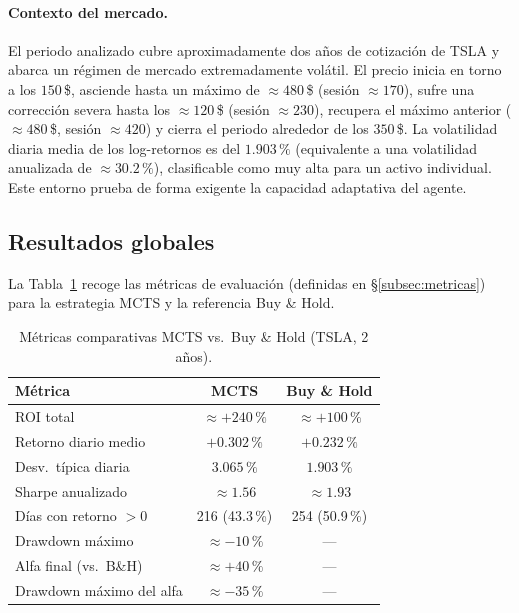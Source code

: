 \paragraph{Contexto del mercado.} El periodo analizado cubre aproximadamente dos años de cotización de TSLA y abarca un régimen de mercado extremadamente volátil. El precio inicia en torno a los $150$\,\$, asciende hasta un máximo de $\approx 480$\,\$ (sesión $\approx 170$), sufre una corrección severa hasta los $\approx 120$\,\$ (sesión $\approx 230$), recupera el máximo anterior ($\approx 480$\,\$, sesión $\approx 420$) y cierra el periodo alrededor de los $350$\,\$. La volatilidad diaria media de los log-retornos es del $1{.}903\,\%$ (equivalente a una volatilidad anualizada de $\approx 30{.}2\,\%$), clasificable como muy alta para un activo individual. Este entorno prueba de forma exigente la capacidad adaptativa del agente.

\subsection{Resultados globales}
\label{subsec:resultados-globales}

La Tabla~\ref{tab:resultados-globales} recoge las métricas de evaluación (definidas en §\ref{subsec:metricas}) para la estrategia MCTS y la referencia Buy \& Hold.

\begin{table}[H]
\centering
\caption{Métricas comparativas MCTS vs.\ Buy \& Hold (TSLA, 2 años).}
\label{tab:resultados-globales}
\begin{tabular}{lcc}
\toprule
\textbf{Métrica} & \textbf{MCTS} & \textbf{Buy \& Hold} \\
\midrule
ROI total             & $\approx +240\,\%$ & $\approx +100\,\%$ \\
Retorno diario medio  & $+0{.}302\,\%$     & $+0{.}232\,\%$ \\
Desv.\ típica diaria  & $3{.}065\,\%$      & $1{.}903\,\%$ \\
Sharpe anualizado     & $\approx 1{.}56$   & $\approx 1{.}93$ \\
Días con retorno $>0$ & 216 (43{.}3\,\%)  & 254 (50{.}9\,\%) \\
Drawdown máximo       & $\approx -10\,\%$  & —\\
Alfa final (vs.\ B\&H)& $\approx +40\,\%$ & — \\
Drawdown máximo del alfa & $\approx -35\,\%$ & — \\
\bottomrule
\end{tabular}
\end{table}

